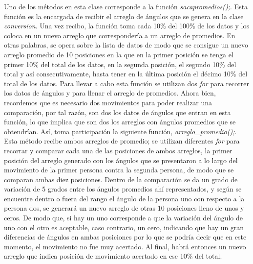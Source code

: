 \documentclass[letterpaper]{article}
\begin{document}
Uno de los métodos en esta clase corresponde a la función \textit{sacapromedios();}. Esta función es la encargada de recibir el arreglo de ángulos que se genera en la clase \textit{conversion}. Una vez recibo, la función toma cada 10\% del 100\% de los datos y los coloca en un nuevo arreglo 
que correspondería a un arreglo de promedios. En otras palabras, se opera sobre la lista de datos de modo que se consigue un nuevo arreglo promedio de 10 posiciones en la que en la primer posición se tenga el primer 10\% del total de los datos, en la segunda posición, el segundo 10\% del total y así consecutivamente, hasta tener en la última posición el décimo 10\% del total de los datos.
Para llevar a cabo esta función se utilizan dos \textit{for} para recorrer los datos de ángulos y para llenar el arreglo de promedios. Ahora bien, recordemos que es necesario dos movimientos para poder realizar una comparación, por tal razón, son dos los datos de ángulos que entran en esta función, lo que implica que son dos los arreglos con ángulos promedios que se obtendrían. Así, toma participación
la siguiente función, \textit{arreglo\_promedio();}. Esta método recibe ambos arreglos de promedio; se utilizan diferentes \textit{for} para recorrar y comparar cada una de las posiciones de ambos arreglos, la primer posición del arreglo generado con los ángulos que se presentaron a lo largo del movimiento de la primer persona contra la segunda persona, de modo que se comparan ambas diez posiciones. Dentro de la comparación
se da un grado de variación de 5 grados entre los ángulos promedios ahí representados, y según se encuentre dentro o fuera del rango el ángulo de la persona uno con respecto a la persona dos, se generará un nuevo arreglo de otras 10 posiciones lleno de unos y ceros. De modo que, si hay un uno corresponde a que la variación del ángulo de uno con el otro es aceptable, caso contrario, un cero, indicando que hay un gran diferencias de ángulos en ambas posiciones
por lo que se podría decir que en este momento, el movimiento no fue muy acertado. Al final, habrá entonces un nuevo arreglo que indica posición de movimiento acertado en ese 10\%  del total.\\
\end{document}
